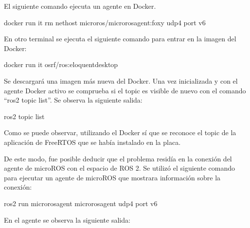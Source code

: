 \documentclass[a4paper,11pt,spanish]{sphinxmanual}
\begin{document}
\sphinxAtStartPar
El siguiente comando ejecuta un agente en Docker.

\begin{sphinxVerbatim}[commandchars=\\\{\},formatcom=\footnotesize]
docker run \PYGZhy{}it \PYGZhy{}\PYGZhy{}rm \PYGZhy{}\PYGZhy{}nethost microros/micro\PYGZhy{}ros\PYGZhy{}agent:foxy udp4 \PYGZhy{}\PYGZhy{}port  \PYGZhy{}v6
\end{sphinxVerbatim}

\sphinxAtStartPar
En otro terminal se ejecuta el siguiente comando para entrar en
la imagen del Docker:

\begin{sphinxVerbatim}[commandchars=\\\{\},formatcom=\footnotesize]
docker run \PYGZhy{}it osrf/ros:eloquent\PYGZhy{}desktop
\end{sphinxVerbatim}

\sphinxAtStartPar
Se descargará una imagen más nueva del Docker. Una vez inicializada
y con el agente Docker activo se comprueba si el topic es visible de
nuevo con el comando “ros2 topic list”. Se observa la siguiente salida:

\begin{sphinxVerbatim}[commandchars=\\\{\},formatcom=\footnotesize]
 ros2 topic list
\end{sphinxVerbatim}

\sphinxAtStartPar
Como se puede observar, utilizando el Docker sí que se reconoce el topic
de la aplicación de FreeRTOS que se había instalado en la placa.

\sphinxAtStartPar
De este modo, fue posible deducir que el problema residía en la conexión
del agente de micro\sphinxhyphen{}ROS con el espacio de ROS 2. Se utilizó el siguiente
comando para ejecutar un agente de micro\sphinxhyphen{}ROS que mostrara información sobre
la conexión:

\begin{sphinxVerbatim}[commandchars=\\\{\},formatcom=\footnotesize]
ros2 run micro\PYGZus{}ros\PYGZus{}agent micro\PYGZus{}ros\PYGZus{}agent udp4 \PYGZhy{}\PYGZhy{}port   \PYGZhy{}v6
\end{sphinxVerbatim}

\sphinxAtStartPar
En el agente se observa la siguiente salida:
\end{document}
